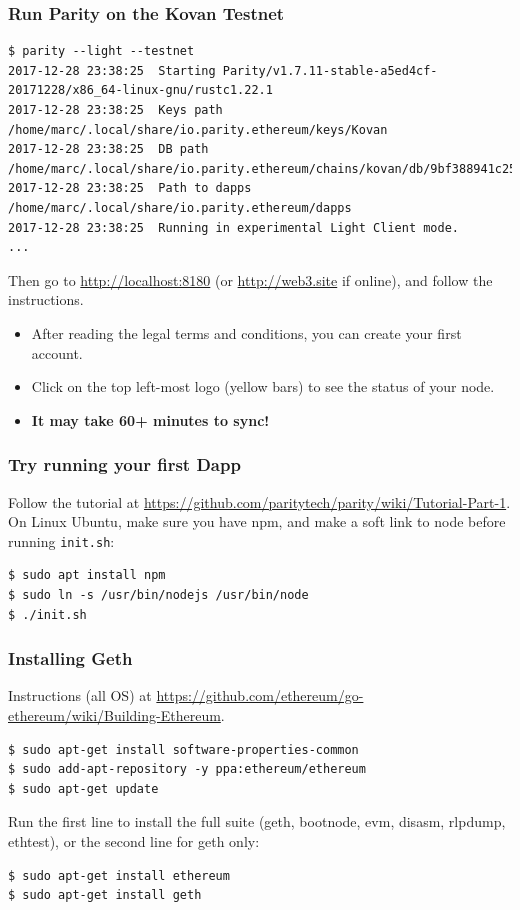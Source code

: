\begin{frame}[fragile]
	\frametitle{Run Parity on the Kovan Testnet}
	\begin{Verbatim}[fontsize=\tiny]
$ parity --light --testnet
2017-12-28 23:38:25  Starting Parity/v1.7.11-stable-a5ed4cf-20171228/x86_64-linux-gnu/rustc1.22.1
2017-12-28 23:38:25  Keys path /home/marc/.local/share/io.parity.ethereum/keys/Kovan
2017-12-28 23:38:25  DB path /home/marc/.local/share/io.parity.ethereum/chains/kovan/db/9bf388941c25ea98
2017-12-28 23:38:25  Path to dapps /home/marc/.local/share/io.parity.ethereum/dapps
2017-12-28 23:38:25  Running in experimental Light Client mode.
...
	\end{Verbatim}
	Then go to \url{http://localhost:8180} (or \url{http://web3.site} if online), and follow the instructions.
	\begin{itemize}
		\item After reading the legal terms and conditions, you can create your first account.
		\item Click on the top left-most logo (yellow bars) to see the status of your node.
		\item \textbf{It may take 60+ minutes to sync!}
	\end{itemize}
\end{frame}

\begin{frame}[fragile]
	\frametitle{Try running your first Dapp}
	Follow the tutorial at \url{https://github.com/paritytech/parity/wiki/Tutorial-Part-1}.\\
	\vspace{1em}
	On Linux Ubuntu, make sure you have npm, and make a soft link to node before running \texttt{init.sh}:
	\begin{Verbatim}[fontsize=\tiny]
$ sudo apt install npm
$ sudo ln -s /usr/bin/nodejs /usr/bin/node 
$ ./init.sh
	\end{Verbatim}	
\end{frame}


\begin{frame}[fragile]
	\frametitle{Installing Geth}
	Instructions (all OS) at \url{https://github.com/ethereum/go-ethereum/wiki/Building-Ethereum}.
	\vspace{.5em}
	\begin{Verbatim}[fontsize=\tiny]
$ sudo apt-get install software-properties-common
$ sudo add-apt-repository -y ppa:ethereum/ethereum
$ sudo apt-get update
	\end{Verbatim}
	Run the first line to install the full suite (geth, bootnode, evm, disasm, rlpdump, ethtest), or the second line for geth only:
	\vspace{.5em}
	\begin{Verbatim}[fontsize=\tiny]
$ sudo apt-get install ethereum
$ sudo apt-get install geth
	\end{Verbatim}
\end{frame}

